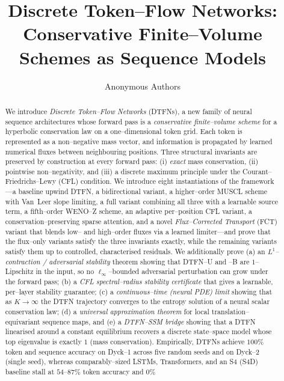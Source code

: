 \documentclass[10pt]{article}
\title{Discrete Token--Flow Networks: \\
       Conservative Finite--Volume Schemes as Sequence Models}
\author{Anonymous Authors}
\date{}
\theoremstyle{definition}
\theoremstyle{remark}
\begin{document}
\maketitle

\begin{abstract}
  We introduce \emph{Discrete Token--Flow Networks} (DTFNs), a new family
  of neural sequence architectures whose forward pass is a
  \emph{conservative finite--volume scheme} for a hyperbolic
  conservation law on a one--dimensional token grid.  Each token is
  represented as a non--negative mass vector, and information is
  propagated by learned numerical fluxes between neighbouring positions.
  Three structural invariants are preserved by construction at every
  forward pass: (i) \emph{exact} mass conservation, (ii) pointwise
  non--negativity, and (iii) a discrete maximum principle under the
  Courant--Friedrichs--Lewy (CFL) condition.  We introduce eight
  instantiations of the framework---a baseline upwind DTFN, a
  bidirectional variant, a higher--order MUSCL scheme with Van~Leer
  slope limiting, a full variant combining all three with a
  learnable source term, a fifth--order WENO--Z scheme, an adaptive
  per--position CFL variant, a conservation--preserving sparse
  attention, and a novel \emph{Flux--Corrected Transport} (FCT)
  variant that blends low-- and high--order fluxes via a learned
  limiter---and prove that the flux--only variants satisfy the three
  invariants exactly, while the remaining variants satisfy them up to
  controlled, characterised residuals.
  We additionally prove (a) an
  \emph{$L^1$--contraction / adversarial stability} theorem showing
  that DTFN--U and --B are $1$--Lipschitz in the input, so no
  $\ell_\infty$--bounded adversarial perturbation can grow under the
  forward pass; (b) a \emph{CFL spectral--radius stability
  certificate} that gives a learnable, per--layer stability guarantee;
  (c) a \emph{continuous--time (neural PDE) limit} showing that as
  $K \to \infty$ the DTFN trajectory converges to the entropy solution
  of a neural scalar conservation law; (d) a \emph{universal
  approximation theorem} for local translation--equivariant sequence
  maps, and (e) a \emph{DTFN--SSM bridge} showing that a DTFN
  linearised around a constant equilibrium recovers a discrete
  state--space model whose top eigenvalue is exactly $1$ (mass
  conservation).  Empirically, DTFNs achieve $100\%$ token and
  sequence accuracy on Dyck--1 across five random seeds and on Dyck--2
  (single seed), whereas comparably--sized LSTMs, Transformers, and an
  S4 (S4D) baseline stall at $54$--$87\%$ token accuracy and $0\%$

\end{abstract}
\end{document}
